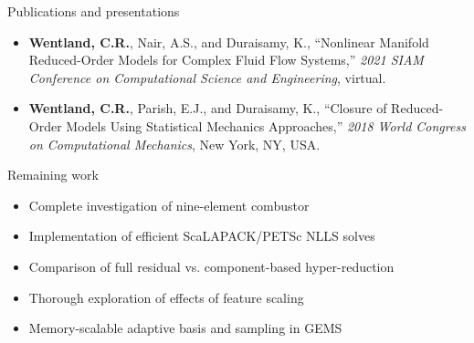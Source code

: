 \documentclass[]{beamer}
\begin{document}
\begin{frame}{Publications and presentations}
\begin{itemize}
\begin{itemize}
			\item \textbf{Wentland, C.R.}, Nair, A.S., and Duraisamy, K., ``Nonlinear Manifold Reduced-Order Models for Complex Fluid Flow Systems,'' \textit{2021 SIAM Conference on Computational Science and Engineering}, virtual.
			\item \tiny \textbf{Wentland, C.R.}, Parish, E.J., and Duraisamy, K., ``Closure of Reduced-Order Models Using Statistical Mechanics Approaches,'' \textit{2018 World Congress on Computational Mechanics}, New York, NY, USA.
		\end{itemize}
	\end{itemize}
	
\end{frame}

\begin{frame}{Remaining work}
	\begin{itemize}
		\item Complete investigation of nine-element combustor
		\item Implementation of efficient ScaLAPACK/PETSc NLLS solves
		\item Comparison of full residual vs. component-based hyper-reduction
		\item Thorough exploration of effects of feature scaling
		\item Memory-scalable adaptive basis and sampling in GEMS
	\end{itemize}
\end{frame}
\end{document}
